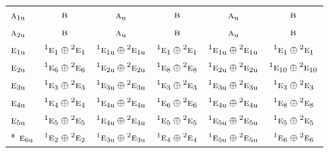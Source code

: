 \documentclass[10pt,a4paper]{article}
\numberwithin{equation}{section}
\newcommand{\irr}[1]{\text{\normalfont\scshape #1}}
\newcommand{\conjpair}[1]{{}^{#1}}
\newcommand{\ptag}[1]{\mathrm{#1}}
\begin{document}
{\begin{longtable}{@{}lccccc@{}}
$\irr{a}_{1\ptag{u}}$ & $\irr{b}$ & $\irr{a}_{\ptag{u}}$ & $\irr{b}$ & $\irr{a}_{\ptag{u}}$ & $\irr{b}$\\
$\irr{a}_{2\ptag{u}}$ & $\irr{b}$ & $\irr{a}_{\ptag{u}}$ & $\irr{b}$ & $\irr{a}_{\ptag{u}}$ & $\irr{b}$\\
$\irr{e}_{1\ptag{u}}$ & $\conjpair{1}\irr{e}_{1}\oplus \conjpair{2}\irr{e}_{1}$ & $\conjpair{1}\irr{e}_{1\ptag{u}}\oplus \conjpair{2}\irr{e}_{1\ptag{u}}$ & $\conjpair{1}\irr{e}_{1}\oplus \conjpair{2}\irr{e}_{1}$ & $\conjpair{1}\irr{e}_{1\ptag{u}}\oplus \conjpair{2}\irr{e}_{1\ptag{u}}$ & $\conjpair{1}\irr{e}_{1}\oplus \conjpair{2}\irr{e}_{1}$\\
$\irr{e}_{2\ptag{u}}$ & $\conjpair{1}\irr{e}_{6}\oplus \conjpair{2}\irr{e}_{6}$ & $\conjpair{1}\irr{e}_{2\ptag{u}}\oplus \conjpair{2}\irr{e}_{2\ptag{u}}$ & $\conjpair{1}\irr{e}_{8}\oplus \conjpair{2}\irr{e}_{8}$ & $\conjpair{1}\irr{e}_{2\ptag{u}}\oplus \conjpair{2}\irr{e}_{2\ptag{u}}$ & $\conjpair{1}\irr{e}_{10}\oplus \conjpair{2}\irr{e}_{10}$\\
$\irr{e}_{3\ptag{u}}$ & $\conjpair{1}\irr{e}_{3}\oplus \conjpair{2}\irr{e}_{3}$ & $\conjpair{1}\irr{e}_{3\ptag{u}}\oplus \conjpair{2}\irr{e}_{3\ptag{u}}$ & $\conjpair{1}\irr{e}_{3}\oplus \conjpair{2}\irr{e}_{3}$ & $\conjpair{1}\irr{e}_{3\ptag{u}}\oplus \conjpair{2}\irr{e}_{3\ptag{u}}$ & $\conjpair{1}\irr{e}_{3}\oplus \conjpair{2}\irr{e}_{3}$\\
$\irr{e}_{4\ptag{u}}$ & $\conjpair{1}\irr{e}_{4}\oplus \conjpair{2}\irr{e}_{4}$ & $\conjpair{1}\irr{e}_{4\ptag{u}}\oplus \conjpair{2}\irr{e}_{4\ptag{u}}$ & $\conjpair{1}\irr{e}_{6}\oplus \conjpair{2}\irr{e}_{6}$ & $\conjpair{1}\irr{e}_{4\ptag{u}}\oplus \conjpair{2}\irr{e}_{4\ptag{u}}$ & $\conjpair{1}\irr{e}_{8}\oplus \conjpair{2}\irr{e}_{8}$\\
$\irr{e}_{5\ptag{u}}$ & $\conjpair{1}\irr{e}_{5}\oplus \conjpair{2}\irr{e}_{5}$ & $\conjpair{1}\irr{e}_{4\ptag{u}}\oplus \conjpair{2}\irr{e}_{4\ptag{u}}$ & $\conjpair{1}\irr{e}_{5}\oplus \conjpair{2}\irr{e}_{5}$ & $\conjpair{1}\irr{e}_{5\ptag{u}}\oplus \conjpair{2}\irr{e}_{5\ptag{u}}$ & $\conjpair{1}\irr{e}_{5}\oplus \conjpair{2}\irr{e}_{5}$\\*
$\irr{e}_{6\ptag{u}}$ & $\conjpair{1}\irr{e}_{2}\oplus \conjpair{2}\irr{e}_{2}$ & $\conjpair{1}\irr{e}_{3\ptag{u}}\oplus \conjpair{2}\irr{e}_{3\ptag{u}}$ & $\conjpair{1}\irr{e}_{4}\oplus \conjpair{2}\irr{e}_{4}$ & $\conjpair{1}\irr{e}_{5\ptag{u}}\oplus \conjpair{2}\irr{e}_{5\ptag{u}}$ & $\conjpair{1}\irr{e}_{6}\oplus \conjpair{2}\irr{e}_{6}$\\
\bottomrule\end{longtable}}
\end{document}
